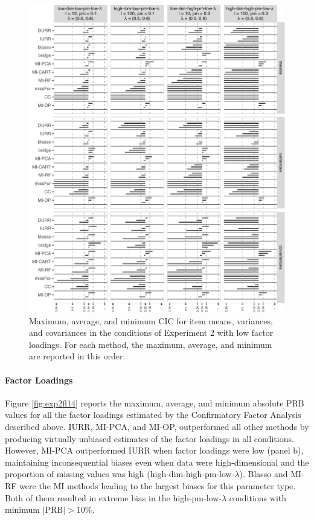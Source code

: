\begin{figure}
	\includegraphics{../../output/graphs/exp2_semR_ci_58_summy.pdf}
\caption{
	Maximum, average, and minimum CIC for item means, variances, and covariances in the conditions of 
	Experiment 2 with low factor loadings.
	For each method, the maximum, average, and minimum are reported in this order.
}
\label{fig:exp2cir58}
\end{figure}

\FloatBarrier

	\paragraph{Factor Loadings}
	Figure \ref{fig:exp2fl14} reports the maximum, average, and minimum absolute PRB values for all the factor 
	loadings estimated by the Confirmatory Factor Analysis described above.
	IURR, MI-PCA, and MI-OP, outperformed all other methods by producing virtually unbiased estimates of the 
	factor loadings in all conditions.
	However, MI-PCA outperformed IURR when factor loadings were low (panel b), maintaining inconsequential 
	biases even when data were high-dimensional and the proportion of missing values was high
	(high-dim-high-pm-low-$\lambda$).
	Blasso and MI-RF were the MI methods leading to the largest biases for this parameter type.
	Both of them resulted in extreme bias in the high-pm-low-$\lambda$ conditions with minimum $|\text{PRB}| > 10\%$.

